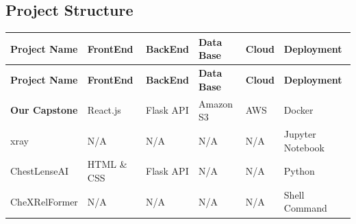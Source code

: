 \documentclass[12pt, titlepage]{article}
\begin{document}
\subsection{Project Structure}

\begin{longtable}{|l|l|l|l|l|l|}
\hline
\textbf{Project Name}   & \textbf{FrontEnd}       & \textbf{BackEnd}   & \textbf{Data Base} & \textbf{Cloud} & \textbf{Deployment} \\ \hline
\endfirsthead
\hline
\textbf{Project Name}   & \textbf{FrontEnd}       & \textbf{BackEnd}   & \textbf{Data Base} & \textbf{Cloud} & \textbf{Deployment} \\ \hline
\endhead
\hline
\endfoot

\textbf{Our Capstone}    & React.js               & Flask API          & Amazon S3          & AWS             & Docker             \\ \hline
xray                    & N/A                    & N/A                & N/A                & N/A             & Jupyter Notebook   \\ \hline
ChestLenseAI            & HTML \& CSS             & Flask API          & N/A                & N/A             & Python             \\ \hline
CheXRelFormer           & N/A                    & N/A                & N/A                & N/A             & Shell Command      \\ \hline

\end{longtable}
\end{document}
